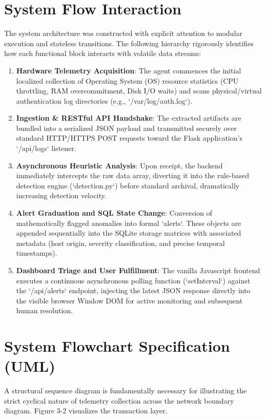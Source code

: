 \section{System Flow Interaction}
The system architecture was constructed with explicit attention to modular execution and stateless transitions. The following hierarchy rigorously identifies how each functional block interacts with volatile data streams:

\begin{enumerate}
    \item \textbf{Hardware Telemetry Acquisition}: The agent commences the initial localized collection of Operating System (OS) resource statistics (CPU throttling, RAM overcommitment, Disk I/O waits) and scans physical/virtual authentication log directories (e.g., `/var/log/auth.log`).
    \item \textbf{Ingestion \& RESTful API Handshake}: The extracted artifacts are bundled into a serialized JSON payload and transmitted securely over standard HTTP/HTTPS POST requests toward the Flask application's `/api/logs` listener.
    \item \textbf{Asynchronous Heuristic Analysis}: Upon receipt, the backend immediately intercepts the raw data array, diverting it into the rule-based detection engine (`detection.py`) before standard archival, dramatically increasing detection velocity.
    \item \textbf{Alert Graduation and SQL State Change}: Conversion of mathematically flagged anomalies into formal `alerts`. These objects are appended sequentially into the SQLite storage matrices with associated metadata (host origin, severity classification, and precise temporal timestamps).
    \item \textbf{Dashboard Triage and User Fulfillment}: The vanilla Javascript frontend executes a continuous asynchronous polling function (`setInterval`) against the `/api/alerts` endpoint, injecting the latest JSON response directly into the visible browser Window DOM for active monitoring and subsequent human resolution.
\end{enumerate}

\section{System Flowchart Specification (UML)}
A structural sequence diagram is fundamentally necessary for illustrating the strict cyclical nature of telemetry collection across the network boundary diagram. Figure 3-2 visualizes the transaction layer.

